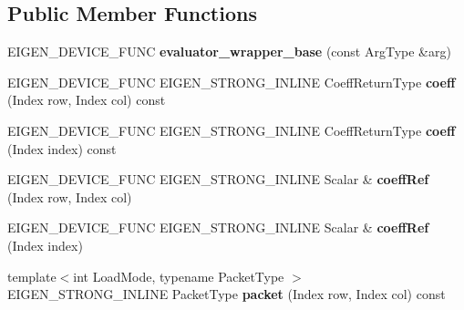 \subsection*{Public Member Functions}
\begin{DoxyCompactItemize}
\item 
\mbox{\label{struct_eigen_1_1internal_1_1evaluator__wrapper__base_a529c1380dce98ac43ff335c41fe3b314}} 
E\+I\+G\+E\+N\+\_\+\+D\+E\+V\+I\+C\+E\+\_\+\+F\+U\+NC {\bfseries evaluator\+\_\+wrapper\+\_\+base} (const Arg\+Type \&arg)
\item 
\mbox{\label{struct_eigen_1_1internal_1_1evaluator__wrapper__base_ae4c999dc0fa9425f31a223fd9528626e}} 
E\+I\+G\+E\+N\+\_\+\+D\+E\+V\+I\+C\+E\+\_\+\+F\+U\+NC E\+I\+G\+E\+N\+\_\+\+S\+T\+R\+O\+N\+G\+\_\+\+I\+N\+L\+I\+NE Coeff\+Return\+Type {\bfseries coeff} (Index row, Index col) const
\item 
\mbox{\label{struct_eigen_1_1internal_1_1evaluator__wrapper__base_addbd1d2f5c426bfc7b64ff449d6c23a4}} 
E\+I\+G\+E\+N\+\_\+\+D\+E\+V\+I\+C\+E\+\_\+\+F\+U\+NC E\+I\+G\+E\+N\+\_\+\+S\+T\+R\+O\+N\+G\+\_\+\+I\+N\+L\+I\+NE Coeff\+Return\+Type {\bfseries coeff} (Index index) const
\item 
\mbox{\label{struct_eigen_1_1internal_1_1evaluator__wrapper__base_ae15e7475c7d4638e8f1229570d468421}} 
E\+I\+G\+E\+N\+\_\+\+D\+E\+V\+I\+C\+E\+\_\+\+F\+U\+NC E\+I\+G\+E\+N\+\_\+\+S\+T\+R\+O\+N\+G\+\_\+\+I\+N\+L\+I\+NE Scalar \& {\bfseries coeff\+Ref} (Index row, Index col)
\item 
\mbox{\label{struct_eigen_1_1internal_1_1evaluator__wrapper__base_ad5084d136cbf11ea3b7e085a3de3244e}} 
E\+I\+G\+E\+N\+\_\+\+D\+E\+V\+I\+C\+E\+\_\+\+F\+U\+NC E\+I\+G\+E\+N\+\_\+\+S\+T\+R\+O\+N\+G\+\_\+\+I\+N\+L\+I\+NE Scalar \& {\bfseries coeff\+Ref} (Index index)
\item 
\mbox{\label{struct_eigen_1_1internal_1_1evaluator__wrapper__base_aa507d02b7eed05b93a9ebfcde14028a7}} 
{\footnotesize template$<$int Load\+Mode, typename Packet\+Type $>$ }\\E\+I\+G\+E\+N\+\_\+\+S\+T\+R\+O\+N\+G\+\_\+\+I\+N\+L\+I\+NE Packet\+Type {\bfseries packet} (Index row, Index col) const

\end{DoxyCompactItemize}

